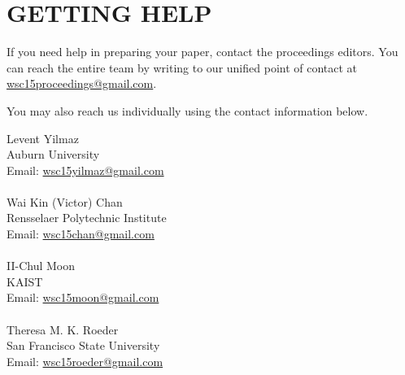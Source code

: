\documentclass{wscposterproc}
\begin{document}
\section{GETTING HELP}
If you need help in preparing your paper, contact the proceedings editors. You can reach the entire team by writing to our unified point of contact at \href{mailto://wsc15proceedings@gmail.com}{wsc15proceedings@gmail.com}.

You may also reach us individually using the contact information below.

\vspace{6pt}

\noindent Levent Yilmaz\\
Auburn University\\
Email: \href{mailto://wsc15yilmaz@gmail.com}{wsc15yilmaz@gmail.com}\\
\\
Wai Kin (Victor) Chan\\
Rensselaer Polytechnic Institute\\
Email: \href{mailto://wsc15chan@gmail.com}{wsc15chan@gmail.com}\\
\\
II-Chul Moon\\
KAIST\\
Email: \href{mailto://wsc15moon@gmail.com}{wsc15moon@gmail.com}\\
\\
Theresa M. K. Roeder\\
San Francisco State University\\
Email: \href{mailto://wsc15roeder@gmail.com}{wsc15roeder@gmail.com}\\
\\


\end{document}
